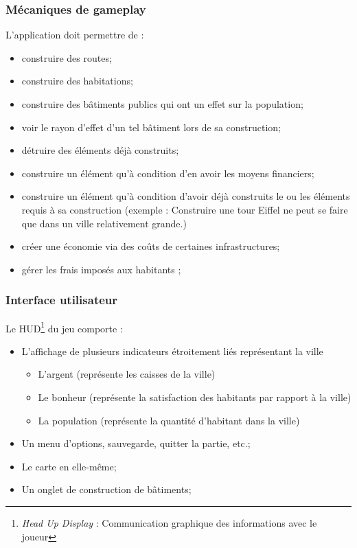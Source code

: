 \documentclass[a4paper,10pt,openany,oneside]{report}
\begin{document}
\subsubsection{Mécaniques de gameplay}
L'application doit permettre de :
\begin{itemize}
\item construire des routes;
\item construire des habitations;
\item construire des bâtiments publics qui ont un effet sur la population;
\item voir le rayon d'effet d'un tel bâtiment lors de sa construction;
\item détruire des éléments déjà construits;
\item construire un élément qu'à condition d'en avoir les moyens financiers;
\item construire un élément qu'à condition d'avoir déjà construits le ou les éléments requis à sa construction (exemple : Construire une tour Eiffel ne peut se faire que dans un ville relativement grande.)
\item créer une économie via des coûts de certaines infrastructures;
\item gérer les frais imposés aux habitants ;
\end{itemize}

\subsubsection{Interface utilisateur}
Le HUD\footnote{\textit{Head Up Display} : Communication graphique des informations avec le joueur} du jeu comporte :
\begin{itemize}
\item L'affichage de plusieurs indicateurs étroitement liés représentant la ville
	\begin{itemize}
		\item L'argent (représente les caisses de la ville)
		\item Le bonheur (représente la satisfaction des habitants par rapport à la ville)
		\item La population (représente la quantité d'habitant dans la ville)
	\end{itemize}
\item Un menu d'options, sauvegarde, quitter la partie, etc.;
\item Le carte en elle-même;
\item Un onglet de construction de bâtiments;
\end{itemize}
\end{document}
